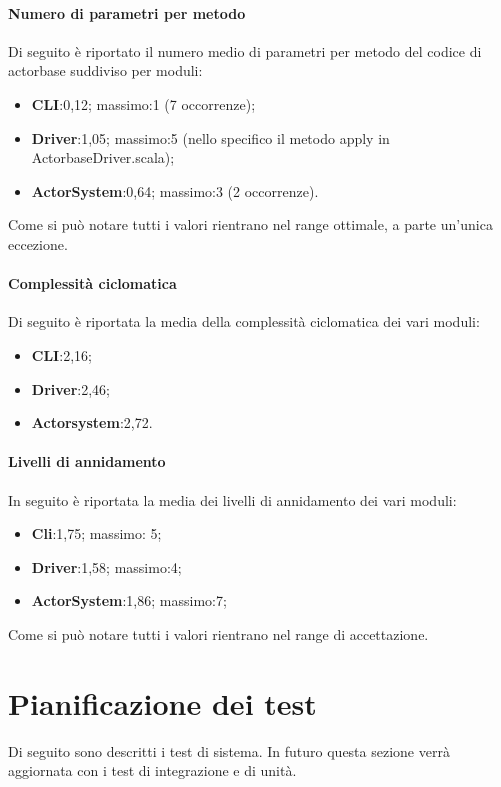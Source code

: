 \documentclass{scalatekids-article}
\begin{document}
	\paragraph{Numero di parametri per metodo}
	Di seguito è riportato il numero medio di parametri per
	metodo del codice di actorbase suddiviso per moduli:
	\begin{itemize}
		\item \textbf{CLI}:0,12; massimo:1 (7 occorrenze);
		\item \textbf{Driver}:1,05; massimo:5 (nello specifico il metodo apply in ActorbaseDriver.scala);
		\item \textbf{ActorSystem}:0,64; massimo:3 (2 occorrenze).
	\end{itemize}
	Come si può notare tutti i valori rientrano nel range ottimale, a parte un'unica eccezione.
	
	
	\paragraph{Complessità ciclomatica}
	Di seguito è riportata la media della complessità ciclomatica dei vari moduli:
	\begin{itemize}
		\item \textbf{CLI}:2,16;
		\item \textbf{Driver}:2,46;
		\item \textbf{Actorsystem}:2,72.
	\end{itemize}
	
	\paragraph{Livelli di annidamento}
	In seguito è riportata la media dei livelli di annidamento dei vari moduli:
	\begin{itemize}
		\item \textbf{Cli}:1,75; massimo: 5;
		\item \textbf{Driver}:1,58; massimo:4;
		\item \textbf{ActorSystem}:1,86; massimo:7;
	\end{itemize}
	Come si può notare tutti i valori rientrano nel range di accettazione.

\newpage

\section{Pianificazione dei test}

Di seguito sono descritti i test di sistema. In futuro questa sezione verrà aggiornata con i test di integrazione e di unità.
\end{document}
